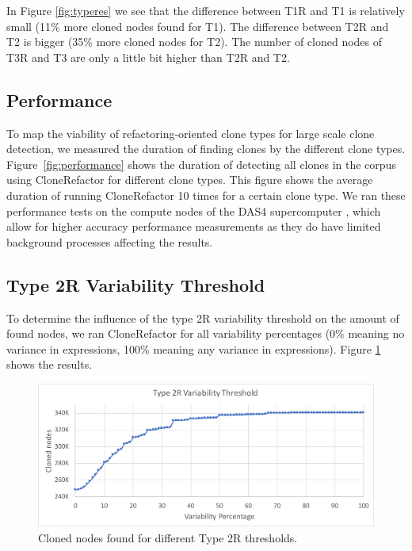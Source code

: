 In Figure \ref{fig:typeres} we see that the difference between T1R and T1 is relatively small (11\% more cloned nodes found for T1). The difference between T2R and T2 is bigger (35\% more cloned nodes for T2). The number of cloned nodes of T3R and T3 are only a little bit higher than T2R and T2.

\subsection{Performance}
To map the viability of refactoring-oriented clone types for large scale clone detection, we measured the duration of finding clones by the different clone types. Figure~\ref{fig:performance} shows the duration of detecting all clones in the corpus using CloneRefactor for different clone types. This figure shows the average duration of running CloneRefactor 10 times for a certain clone type. We ran these performance tests on the compute nodes of the DAS4 supercomputer \cite{bal2016medium}, which allow for higher accuracy performance measurements as they do have limited background processes affecting the results. %

\subsection{Type 2R Variability Threshold}
To determine the influence of the type 2R variability threshold on the amount of found nodes, we ran CloneRefactor for all variability percentages (0\% meaning no variance in expressions, 100\% meaning any variance in expressions). Figure \ref{fig:t2rgraph} shows the results.

\begin{figure}[H]
  \includegraphics[width=1\textwidth]{img/T2R}
  \caption{Cloned nodes found for different Type 2R thresholds.}
  \label{fig:t2rgraph}
\end{figure}

